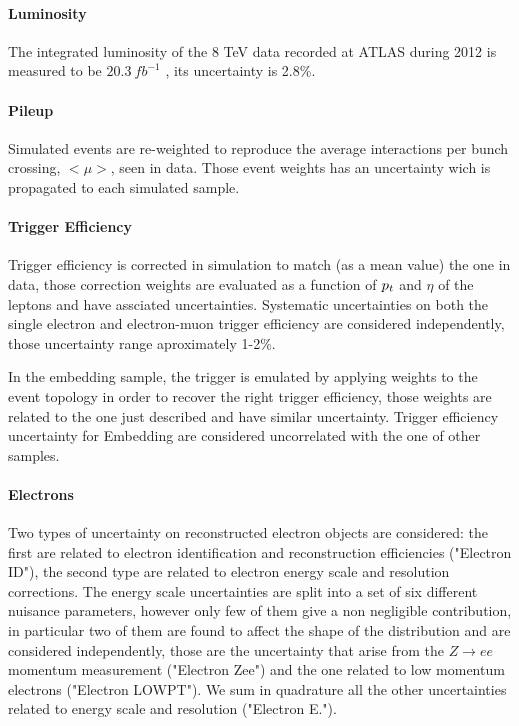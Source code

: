 \paragraph{Luminosity}
The integrated luminosity of the 8 TeV data recorded at ATLAS during 2012 is measured to be $20.3 ~ fb^{-1}$ \cite{luminosity}, its uncertainty  is  2.8\%.

\paragraph{Pileup}
Simulated events are re-weighted to reproduce the average interactions per bunch crossing, $<\mu>$, seen in data. 
Those event weights has an uncertainty wich is propagated to each simulated sample.

\paragraph{Trigger Efficiency}
Trigger efficiency is corrected in simulation to match (as a mean value) the one in data, those correction weights 
are evaluated as a function of $p_{t}$ and $\eta$ of the leptons and have assciated uncertainties. 
Systematic uncertainties on both the single electron and electron-muon trigger efficiency are considered independently,  
those uncertainty range aproximately 1-2\%.

In the embedding sample, the trigger is emulated by applying weights to the event
topology in order to recover the right trigger efficiency, those weights are related to the one just described
and have similar uncertainty. Trigger efficiency uncertainty for Embedding are considered uncorrelated with 
the one of other samples.

\paragraph{Electrons}
Two types of uncertainty on reconstructed electron objects are considered:
the first are related to electron identification and reconstruction efficiencies ("Electron ID"), 
the second type are related to electron energy scale and resolution corrections.
The energy scale uncertainties are split into a set of six different nuisance parameters, 
however only few of them give a non negligible contribution, in particular two of them are found
to affect the shape of the \mmc distribution and are considered independently, those are the uncertainty
that arise from the $Z \rightarrow ee$ momentum measurement ("Electron Zee") 
and the one related to low momentum electrons ("Electron LOWPT"). 
We sum in quadrature all the other uncertainties related to energy scale and 
resolution ("Electron E.").

